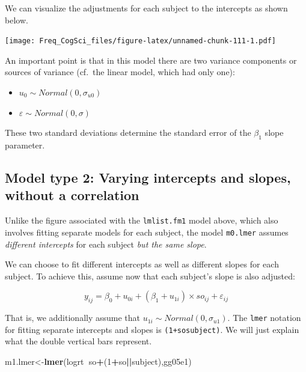 \documentclass[12pt,]{krantz}
\newenvironment{Shaded}{\begin{snugshade}}{\end{snugshade}}
\newcommand{\DecValTok}[1]{\textcolor[rgb]{0.00,0.00,0.81}{#1}}
\newcommand{\KeywordTok}[1]{\textcolor[rgb]{0.13,0.29,0.53}{\textbf{#1}}}
\newcommand{\NormalTok}[1]{#1}
\newcommand{\OperatorTok}[1]{\textcolor[rgb]{0.81,0.36,0.00}{\textbf{#1}}}
\providecommand{\tightlist}{%
  \setlength{\itemsep}{0pt}\setlength{\parskip}{0pt}}
\begin{document}
We can visualize the adjustments for each subject to the intercepts as shown below.

\texttt{[image: Freq\_CogSci\_files/figure-latex/unnamed-chunk-111-1.pdf]}

An important point is that in this model there are two variance components or sources of variance (cf.~the linear model, which had only one):

\begin{itemize}
\tightlist
\item
  \(u_0 \sim Normal(0,\sigma_{u0})\)
\item
  \(\varepsilon \sim Normal(0,\sigma)\)
\end{itemize}

These two standard deviations determine the standard error of the \(\beta_1\) slope parameter.

\hypertarget{model-type-2-varying-intercepts-and-slopes-without-a-correlation}{%
\subsection{Model type 2: Varying intercepts and slopes, without a correlation}\label{model-type-2-varying-intercepts-and-slopes-without-a-correlation}}

Unlike the figure associated with the \texttt{lmlist.fm1} model above, which also involves fitting separate models for each subject, the model \texttt{m0.lmer} assumes \emph{different intercepts} for each subject \emph{but the same slope}.

We can choose to fit different intercepts as well as different slopes for each subject. To achieve this, assume now that each subject's slope is also adjusted:

\begin{equation}
y_{ij} = \beta_0 + u_{0i}+(\beta_1+u_{1i})\times so_{ij} + \varepsilon_{ij}
\end{equation}

That is, we additionally assume that \(u_{1i} \sim Normal(0,\sigma_{u1})\). The \texttt{lmer} notation for fitting separate intercepts and slopes is \texttt{(1+so\textbar{}\textbar{}subject)}. We will just explain what the double vertical bars represent.

\begin{Shaded}
\begin{Highlighting}[]
\NormalTok{m1.lmer<-}\KeywordTok{lmer}\NormalTok{(logrt}\OperatorTok{~}\NormalTok{so}\OperatorTok{+}\NormalTok{(}\DecValTok{1}\OperatorTok{+}\NormalTok{so}\OperatorTok{||}\NormalTok{subject),gg05e1)}
\end{Highlighting}
\end{Shaded}
\end{document}
